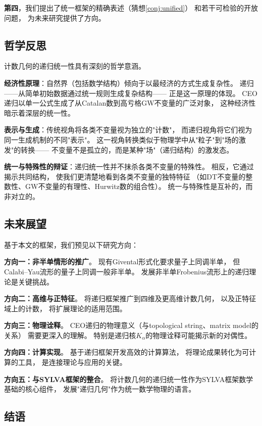 \documentclass[11pt,a4paper]{article}
\theoremstyle{plain}
\theoremstyle{definition}
\begin{document}
\textbf{第四}，我们提出了统一框架的精确表述（猜想\ref{conj:unified}）
和若干可检验的开放问题，
为未来研究提供了方向。

\subsection{哲学反思}

计数几何的递归统一性具有深刻的哲学意涵。

\textbf{经济性原理}：自然界（包括数学结构）倾向于以最经济的方式生成复杂性。
递归——从简单初始数据通过统一规则生成复杂结构——
正是这一原理的体现。
CEO递归以单一公式生成了从Catalan数到高亏格GW不变量的广泛对象，
这种经济性暗示着深层的统一性。

\textbf{表示与生成}：传统视角将各类不变量视为独立的"计数"，
而递归视角将它们视为同一生成机制的不同"表示"。
这一视角转换类似于物理学中从"粒子"到"场的激发"的转换——
不变量不是孤立的，而是某种"场"（递归结构）的激发态。

\textbf{统一与特殊性的辩证}：递归统一性并不抹杀各类不变量的特殊性。
相反，它通过揭示共同结构，
使我们更清楚地看到各类不变量的独特特征
（如DT不变量的整数性、GW不变量的有理性、Hurwitz数的组合性）。
统一与特殊性是互补的，而非对立的。

\subsection{未来展望}

基于本文的框架，我们预见以下研究方向：

\textbf{方向一：非半单情形的推广}。
现有Givental形式化要求量子上同调半单，
但Calabi--Yau流形的量子上同调一般非半单。
发展非半单Frobenius流形上的递归理论是关键挑战。

\textbf{方向二：高维与正特征}。
将递归框架推广到四维及更高维计数几何，
以及正特征域上的计数，
将扩展理论的适用范围。

\textbf{方向三：物理诠释}。
CEO递归的物理意义（与topological string、matrix model的关系）
需要更深入的理解。
特别是递归核$K_\alpha$的物理诠释可能揭示新的对偶性。

\textbf{方向四：计算实现}。
基于递归框架开发高效的计算算法，
将理论成果转化为可计算的工具，
是连接理论与应用的关键。

\textbf{方向五：与SYLVA框架的整合}。
将计数几何的递归统一性作为SYLVA框架数学基础的核心组件，
发展"递归几何"作为统一数学物理的语言。

\subsection{结语}
\end{document}
